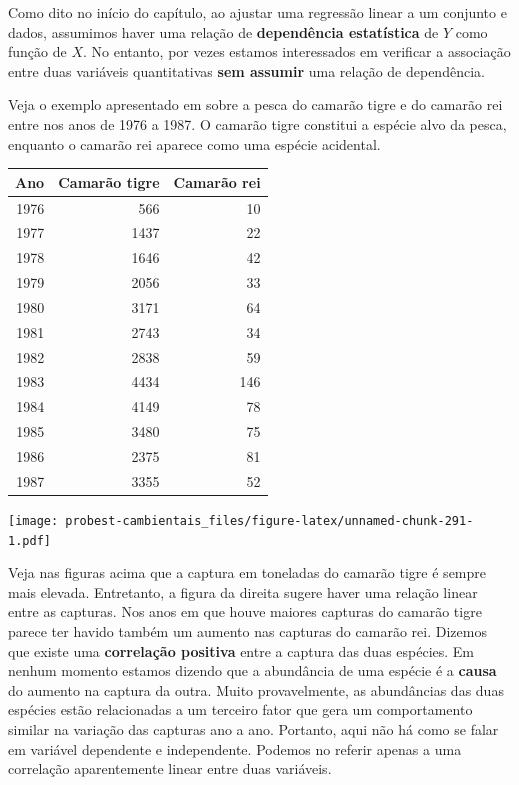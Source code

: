 \documentclass[
]{book}
\begin{document}
Como dito no início do capítulo, ao ajustar uma regressão linear a um conjunto e dados, assumimos haver uma relação de \textbf{dependência estatística} de \(Y\) como função de \(X\). No entanto, por vezes estamos interessados em verificar a associação entre duas variáveis quantitativas \textbf{sem assumir} uma relação de dependência.

Veja o exemplo apresentado em \citep{haddon2010modelling} sobre a pesca do camarão tigre e do camarão rei entre nos anos de 1976 a 1987. O camarão tigre constitui a espécie alvo da pesca, enquanto o camarão rei aparece como uma espécie acidental.

\begin{tabular}{r|r|r}
\hline
Ano & Camarão tigre & Camarão rei\\
\hline
1976 & 566 & 10\\
\hline
1977 & 1437 & 22\\
\hline
1978 & 1646 & 42\\
\hline
1979 & 2056 & 33\\
\hline
1980 & 3171 & 64\\
\hline
1981 & 2743 & 34\\
\hline
1982 & 2838 & 59\\
\hline
1983 & 4434 & 146\\
\hline
1984 & 4149 & 78\\
\hline
1985 & 3480 & 75\\
\hline
1986 & 2375 & 81\\
\hline
1987 & 3355 & 52\\
\hline
\end{tabular}

\texttt{[image: probest-cambientais\_files/figure-latex/unnamed-chunk-291-1.pdf]}

Veja nas figuras acima que a captura em toneladas do camarão tigre é sempre mais elevada. Entretanto, a figura da direita sugere haver uma relação linear entre as capturas. Nos anos em que houve maiores capturas do camarão tigre parece ter havido também um aumento nas capturas do camarão rei. Dizemos que existe uma \textbf{correlação positiva} entre a captura das duas espécies. Em nenhum momento estamos dizendo que a abundância de uma espécie é a \textbf{causa} do aumento na captura da outra. Muito provavelmente, as abundâncias das duas espécies estão relacionadas a um terceiro fator que gera um comportamento similar na variação das capturas ano a ano. Portanto, aqui não há como se falar em variável dependente e independente. Podemos no referir apenas a uma correlação aparentemente linear entre duas variáveis.
\end{document}
